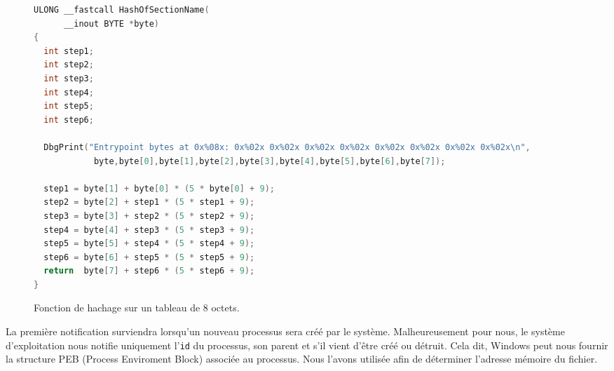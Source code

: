 \begin{figure}
\scriptsize
\begin{changemargin}{-1cm}{-1cm}
\begin{lstlisting}[language={C}]
ULONG __fastcall HashOfSectionName(
      __inout BYTE *byte)
{
  int step1; 
  int step2; 
  int step3; 
  int step4; 
  int step5; 
  int step6; 

  DbgPrint("Entrypoint bytes at 0x%08x: 0x%02x 0x%02x 0x%02x 0x%02x 0x%02x 0x%02x 0x%02x 0x%02x\n",
            byte,byte[0],byte[1],byte[2],byte[3],byte[4],byte[5],byte[6],byte[7]);
 
  step1 = byte[1] + byte[0] * (5 * byte[0] + 9);
  step2 = byte[2] + step1 * (5 * step1 + 9);
  step3 = byte[3] + step2 * (5 * step2 + 9);
  step4 = byte[4] + step3 * (5 * step3 + 9);
  step5 = byte[5] + step4 * (5 * step4 + 9);
  step6 = byte[6] + step5 * (5 * step5 + 9);
  return  byte[7] + step6 * (5 * step6 + 9);
}
\end{lstlisting}
\end{changemargin}
\caption{Fonction de hachage sur un tableau de 8 octets.\label{fig:AThierry_HashOfSectionName}}
\end{figure}
La première notification surviendra lorsqu'un nouveau processus sera créé par le système. Malheureusement pour nous, le système d'exploitation nous notifie uniquement l'\texttt{id} du processus, son parent et s'il vient d'être créé ou détruit. Cela dit, Windows peut nous fournir la structure PEB (Process Enviroment Block) associée au processus. Nous l'avons utilisée afin de déterminer l'adresse mémoire du fichier.

